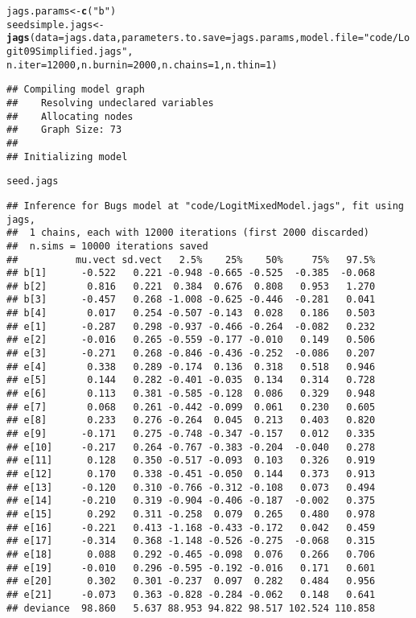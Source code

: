\documentclass[12pt,letterpaper,oneside]{article}\usepackage{graphicx, color}
\makeatletter
\newcommand{\hlfunctioncall}[1]{\textcolor[rgb]{0.501960784313725,0,0.329411764705882}{\textbf{#1}}}%
\newcommand{\hlstring}[1]{\textcolor[rgb]{0.6,0.6,1}{#1}}%
\newenvironment{kframe}{%
 \def\at@end@of@kframe{}%
 \ifinner\ifhmode%
  \def\at@end@of@kframe{\end{minipage}}%
  \begin{minipage}{\columnwidth}%
 \fi\fi%
 \def\FrameCommand##1{\hskip\@totalleftmargin \hskip-\fboxsep
 \colorbox{shadecolor}{##1}\hskip-\fboxsep
     \hskip-\linewidth \hskip-\@totalleftmargin \hskip\columnwidth}%
 \MakeFramed {\advance\hsize-\width
   \@totalleftmargin\z@ \linewidth\hsize
   \@setminipage}}%
 {\par\unskip\endMakeFramed%
 \at@end@of@kframe}
\newenvironment{knitrout}{}{} %
\makeatother
\begin{document}
\begin{knitrout}
\begin{kframe}
\begin{alltt}
jags.params <- \hlfunctioncall{c}(\hlstring{"b"})
seedsimple.jags <- \hlfunctioncall{jags}(data = jags.data, parameters.to.save = jags.params, model.file = \hlstring{"code/Logit09Simplified.jags"}, 
    n.iter = 12000, n.burnin = 2000, n.chains = 1, n.thin = 1)
\end{alltt}
\begin{verbatim}
## Compiling model graph
##    Resolving undeclared variables
##    Allocating nodes
##    Graph Size: 73
## 
## Initializing model
\end{verbatim}
\begin{alltt}
seed.jags
\end{alltt}
\begin{verbatim}
## Inference for Bugs model at "code/LogitMixedModel.jags", fit using jags,
##  1 chains, each with 12000 iterations (first 2000 discarded)
##  n.sims = 10000 iterations saved
##          mu.vect sd.vect   2.5%    25%    50%     75%   97.5%
## b[1]      -0.522   0.221 -0.948 -0.665 -0.525  -0.385  -0.068
## b[2]       0.816   0.221  0.384  0.676  0.808   0.953   1.270
## b[3]      -0.457   0.268 -1.008 -0.625 -0.446  -0.281   0.041
## b[4]       0.017   0.254 -0.507 -0.143  0.028   0.186   0.503
## e[1]      -0.287   0.298 -0.937 -0.466 -0.264  -0.082   0.232
## e[2]      -0.016   0.265 -0.559 -0.177 -0.010   0.149   0.506
## e[3]      -0.271   0.268 -0.846 -0.436 -0.252  -0.086   0.207
## e[4]       0.338   0.289 -0.174  0.136  0.318   0.518   0.946
## e[5]       0.144   0.282 -0.401 -0.035  0.134   0.314   0.728
## e[6]       0.113   0.381 -0.585 -0.128  0.086   0.329   0.948
## e[7]       0.068   0.261 -0.442 -0.099  0.061   0.230   0.605
## e[8]       0.233   0.276 -0.264  0.045  0.213   0.403   0.820
## e[9]      -0.171   0.275 -0.748 -0.347 -0.157   0.012   0.335
## e[10]     -0.217   0.264 -0.767 -0.383 -0.204  -0.040   0.278
## e[11]      0.128   0.350 -0.517 -0.093  0.103   0.326   0.919
## e[12]      0.170   0.338 -0.451 -0.050  0.144   0.373   0.913
## e[13]     -0.120   0.310 -0.766 -0.312 -0.108   0.073   0.494
## e[14]     -0.210   0.319 -0.904 -0.406 -0.187  -0.002   0.375
## e[15]      0.292   0.311 -0.258  0.079  0.265   0.480   0.978
## e[16]     -0.221   0.413 -1.168 -0.433 -0.172   0.042   0.459
## e[17]     -0.314   0.368 -1.148 -0.526 -0.275  -0.068   0.315
## e[18]      0.088   0.292 -0.465 -0.098  0.076   0.266   0.706
## e[19]     -0.010   0.296 -0.595 -0.192 -0.016   0.171   0.601
## e[20]      0.302   0.301 -0.237  0.097  0.282   0.484   0.956
## e[21]     -0.073   0.363 -0.828 -0.284 -0.062   0.148   0.641
## deviance  98.860   5.637 88.953 94.822 98.517 102.524 110.858

\end{verbatim}
\end{kframe}
\end{knitrout}
\end{document}
